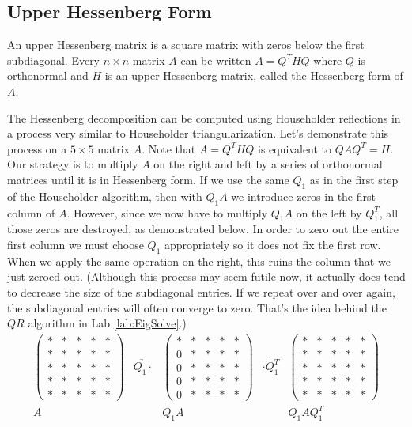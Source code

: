 \subsection*{Upper Hessenberg Form}
An upper Hessenberg matrix is a square matrix with zeros below the first subdiagonal.
Every  $n \times n$ matrix $A$ can be written $A = Q^THQ$ where $Q$ is orthonormal and $H$ is an upper Hessenberg matrix, called the Hessenberg form of $A$.

The Hessenberg decomposition can be computed using Householder reflections in a process very similar to Householder triangularization.
Let's demonstrate this process on a $5 \times 5$ matrix $A$.
Note that $A=Q^THQ$ is equivalent to $QAQ^T = H$. Our strategy is to multiply $A$ on the right and left by a series of orthonormal matrices until it is in Hessenberg form.
If we use the same $Q_1$ as in the first step of the Householder algorithm, then with $Q_1 A$ we introduce zeros in the first column of $A$.
However, since we now have to multiply $Q_1 A$ on the left by $Q_1^T$, all those zeros are destroyed, as demonstrated below.
In order to zero out the entire first column we must choose $Q_1$ appropriately so it does not fix the first row. When we apply the same operation on the right, this ruins the column that we just zeroed out.
(Although this process may seem futile now, it actually does tend to decrease the size of the subdiagonal entries.
If we repeat over and over again, the subdiagonal entries will often converge to zero. That's the idea behind the $QR$ algorithm in Lab \ref{lab:EigSolve}.)
\[
\begin{array}{ccccc}
\begin{pmatrix}
* & * & * & * & * \\
* & * & * & * & * \\
* & * & * & * & * \\
* & * & * & * & * \\
* & * & * & * & *
\end{pmatrix}
&\underrightarrow{Q_1 \cdot }&
\begin{pmatrix}
* & * & * & * & * \\
0 & * & * & * & * \\
0 & * & * & * & * \\
0 & * & * & * & * \\
0 & * & * & * & *
\end{pmatrix}
&\underrightarrow{\cdot Q_1^T }&
\begin{pmatrix}
* & * & * & * & * \\
* & * & * & * & * \\
* & * & * & * & * \\
* & * & * & * & * \\
* & * & * & * & *
\end{pmatrix}
\\
A & & Q_1A & & Q_1 A Q_1^T
  \end{array}
\]
